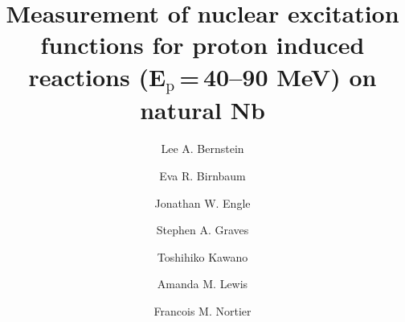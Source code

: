 \documentclass[3p]{elsarticle}
\begin{document}
\begin{frontmatter}
% 
% 


\author[lbl,ucb]{Lee A. Bernstein}


\author[lanl]{Eva R. Birnbaum}

\author[uwm]{Jonathan W. Engle}


\author[iowa]{Stephen A. Graves}

\author[tlanl]{Toshihiko  Kawano}


\author[ucb]{Amanda M. Lewis}


\author[lanl]{Francois M. Nortier}

\address[ucb]{Department of Nuclear Engineering, University of California, Berkeley,  Berkeley, CA 94720, USA}
\address[lbl]{Nuclear Science Division, Lawrence Berkeley National Laboratory,  Berkeley, CA 94720, USA}
\address[uwm]{Department of Medical Physics, University of Wisconsin -- Madison,  Madison, WI 53705, USA}
\address[lanl]{Isotope Production Facility, Chemistry Division, Los Alamos National Laboratory,  Los Alamos, NM 87544, USA}
\address[iowa]{Department of Radiation Oncology, University of Iowa,  Iowa City, IA 52242, USA}
\address[tlanl]{Theoretical Division, Los Alamos National Laboratory,  Los Alamos, NM 87544, USA}

% 
% 
% 
\title{Measurement of nuclear excitation functions for proton induced reactions (E\texorpdfstring{$_{\text{p}}$\,=\,}{Ep = 40--90}40--90 MeV) on natural Nb}


\end{frontmatter}
\end{document}

